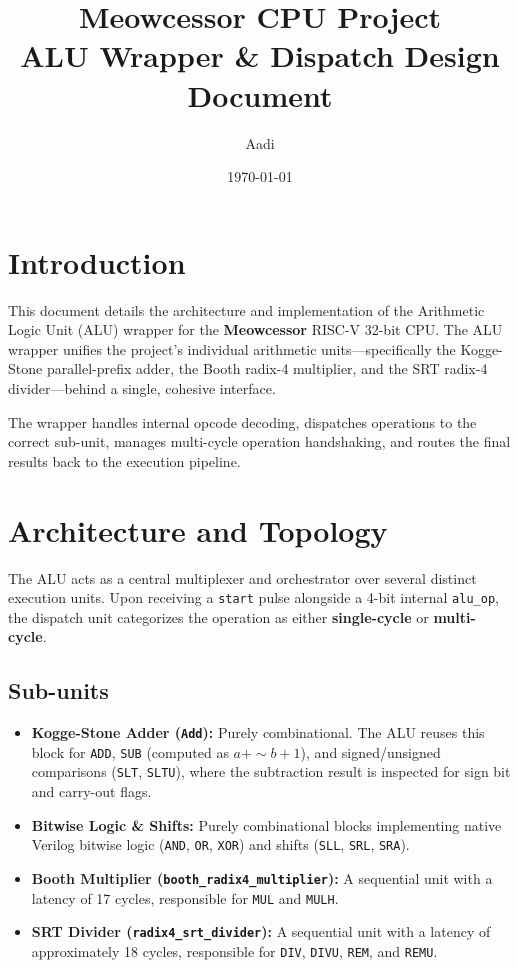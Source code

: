 \documentclass[12pt,a4paper]{article}
\begin{document}
\title{\textbf{Meowcessor CPU Project}\\ \Large ALU Wrapper \& Dispatch Design Document}
\author{Aadi}
\date{\today}
\maketitle

\tableofcontents
\newpage

\section{Introduction}
This document details the architecture and implementation of the Arithmetic Logic Unit (ALU) wrapper for the \textbf{Meowcessor} RISC-V 32-bit CPU. The ALU wrapper unifies the project's individual arithmetic units—specifically the Kogge-Stone parallel-prefix adder, the Booth radix-4 multiplier, and the SRT radix-4 divider—behind a single, cohesive interface. 

The wrapper handles internal opcode decoding, dispatches operations to the correct sub-unit, manages multi-cycle operation handshaking, and routes the final results back to the execution pipeline.

\section{Architecture and Topology}
The ALU acts as a central multiplexer and orchestrator over several distinct execution units. Upon receiving a \texttt{start} pulse alongside a 4-bit internal \texttt{alu\_op}, the dispatch unit categorizes the operation as either \textbf{single-cycle} or \textbf{multi-cycle}.

\subsection{Sub-units}
\begin{itemize}
    \item \textbf{Kogge-Stone Adder (\texttt{Add}):} Purely combinational. The ALU reuses this block for \texttt{ADD}, \texttt{SUB} (computed as $a + \sim b + 1$), and signed/unsigned comparisons (\texttt{SLT}, \texttt{SLTU}), where the subtraction result is inspected for sign bit and carry-out flags.
    \item \textbf{Bitwise Logic \& Shifts:} Purely combinational blocks implementing native Verilog bitwise logic (\texttt{AND}, \texttt{OR}, \texttt{XOR}) and shifts (\texttt{SLL}, \texttt{SRL}, \texttt{SRA}).
    \item \textbf{Booth Multiplier (\texttt{booth\_radix4\_multiplier}):} A sequential unit with a latency of 17 cycles, responsible for \texttt{MUL} and \texttt{MULH}.
    \item \textbf{SRT Divider (\texttt{radix4\_srt\_divider}):} A sequential unit with a latency of approximately 18 cycles, responsible for \texttt{DIV}, \texttt{DIVU}, \texttt{REM}, and \texttt{REMU}.
\end{itemize}
\end{document}
